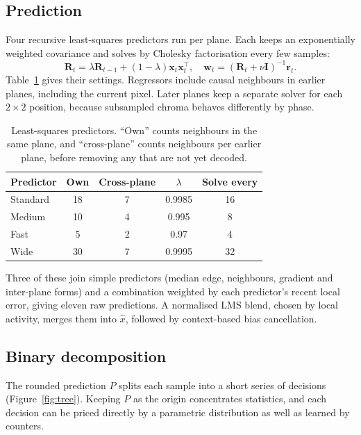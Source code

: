 \documentclass[10pt,twocolumn]{article}
\begin{document}
\subsection{Prediction}

Four recursive least-squares predictors run per plane. Each keeps an exponentially weighted covariance and solves by Cholesky factorisation every few samples:
\begin{equation}
\mathbf{R}_t=\lambda\mathbf{R}_{t-1}+(1-\lambda)\mathbf{x}_t\mathbf{x}_t^\top,\quad
\mathbf{w}_t=(\mathbf{R}_t+\nu\mathbf{I})^{-1}\mathbf{r}_t.
\end{equation}
Table~\ref{tab:ols} gives their settings. Regressors include causal neighbours in earlier planes, including the current pixel. Later planes keep a separate solver for each $2\times2$ position, because subsampled chroma behaves differently by phase.

\begin{table}[t]
\centering\small
\caption{Least-squares predictors. ``Own'' counts neighbours in the same plane, and ``cross-plane'' counts neighbours per earlier plane, before removing any that are not yet decoded.}
\label{tab:ols}
\setlength{\tabcolsep}{5pt}
\begin{tabular}{@{}lcccc@{}}
\toprule
Predictor & Own & Cross-plane & $\lambda$ & Solve every\\
\midrule
Standard & 18 & 7 & 0.9985 & 16\\
Medium & 10 & 4 & 0.995 & 8\\
Fast & 5 & 2 & 0.97 & 4\\
Wide & 30 & 7 & 0.9995 & 32\\
\bottomrule
\end{tabular}
\end{table}

Three of these join simple predictors (median edge, neighbours, gradient and inter-plane forms) and a combination weighted by each predictor's recent local error, giving eleven raw predictions. A normalised LMS blend, chosen by local activity, merges them into $\hat{x}$, followed by context-based bias cancellation.

\subsection{Binary decomposition}

The rounded prediction $P$ splits each sample into a short series of decisions (Figure~\ref{fig:tree}). Keeping $P$ as the origin concentrates statistics, and each decision can be priced directly by a parametric distribution as well as learned by counters.
\end{document}
